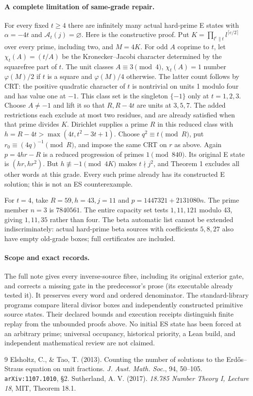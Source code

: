 \documentclass[10pt]{article}
\begin{document}
\paragraph{A complete limitation of same-grade repair.}
For every fixed $t\ge4$ there are infinitely many actual hard-prime E states
with $\alpha=-4t$ and $\mathcal A_t(j)=\varnothing$.
Here is the constructive proof. Put
$K=\prod_{l^e\parallel t}l^{\lceil e/2\rceil}$ over every prime, including
two, and \(M=4K\). For odd \(A\) coprime to \(t\), let
\(\chi_t(A)=(t/A)\) be the Kronecker--Jacobi character determined by the
squarefree part of \(t\). The unit classes \(A\equiv3\pmod4\),
\(\chi_t(A)=1\) number \(\varphi(M)/2\)
if $t$ is a square and $\varphi(M)/4$ otherwise. The latter count follows by
CRT: the positive quadratic character of $t$ is nontrivial on units 1 modulo
four and has value one at $-1$. This class set is the singleton $\{-1\}$ only
at $t=1,2,3$. Choose $A\ne-1$ and lift it so that $R,R-4t$ are units at
$3,5,7$. The added restrictions each exclude at most two residues, and are
already satisfied when that prime divides $K$.
Dirichlet supplies a prime \(R\) in this reduced class with
$h=R-4t>\max(4t,t^2-3t+1)$. Choose \(q^2\equiv t\pmod R\), put
\(r_0\equiv(4q)^{-1}\pmod R\), and impose the
same CRT on $r$ as above. Again $p=4hr-R$ is a reduced progression of primes
$1\pmod{840}$. Its original E state is $(hr,hr^2)$.
But $h\not\equiv-1\pmod{4K}$ makes $t\nmid j^2$, and Theorem 1 excludes
all other words at this grade. Every such prime already has its constructed
E solution; this is not an ES counterexample.

For $t=4$, take $R=59,h=43,j=11$ and
$p=1447321+2131080n$. The prime member $n=3$ is $7840561$.
The entire capacity set tests $1,11,121$ modulo 43, giving $1,11,35$ rather
than four. The beta automatic list cannot be extended indiscriminately:
actual hard-prime beta sources with coefficients $5,8,27$ also have empty
old-grade boxes; full certificates are included.

\paragraph{Scope and exact records.}
The full note gives every inverse-source fibre, including its original exterior
gate, and corrects a missing gate in the predecessor's prose (its executable
already tested it). It preserves every word and ordered denominator. The
standard-library programs compare literal divisor boxes and independently
constructed primitive source states. Their declared bounds and execution
receipts distinguish finite replay from the unbounded proofs above. No initial
ES state has been forced at an arbitrary prime; universal occupancy, historical
priority, a Lean build, and independent mathematical review are not claimed.

\begin{thebibliography}{9}
 Elsholtz, C., \& Tao, T. (2013). Counting the number of solutions to
the Erd\H{o}s--Straus equation on unit fractions. \emph{J. Aust. Math. Soc.},
94, 50--105. \texttt{arXiv:1107.1010}, \S2.
 Sutherland, A. V. (2017). \emph{18.785 Number Theory I,
Lecture 18}, MIT, Theorem 18.1.
\end{thebibliography}
\end{document}
